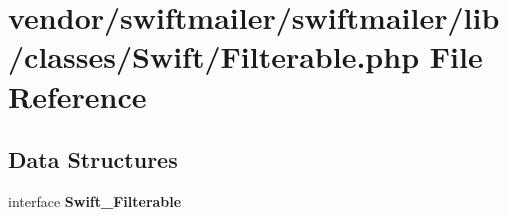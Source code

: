 \section{vendor/swiftmailer/swiftmailer/lib/classes/\+Swift/\+Filterable.php File Reference}
\label{_filterable_8php}
\subsection*{Data Structures}
\begin{DoxyCompactItemize}
\item 
interface {\bf Swift\+\_\+\+Filterable}
\end{DoxyCompactItemize}
